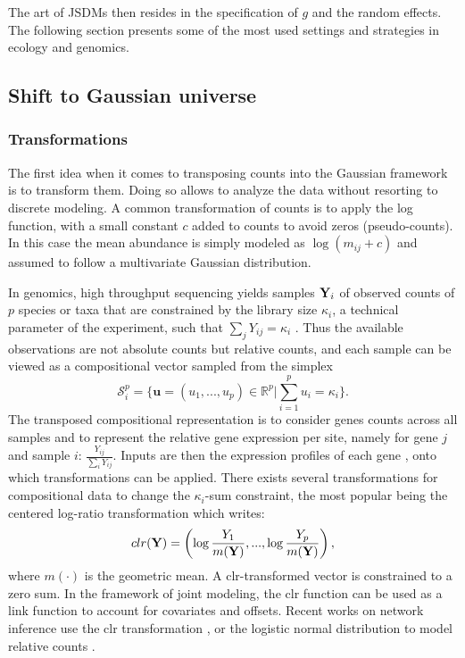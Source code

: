 The art of JSDMs then resides in the specification of $g$ and the random effects. The following section presents some of the most used settings and strategies in ecology and genomics.

\subsection{Shift to Gaussian universe} 
\subsubsection{Transformations}
The first idea when it comes to transposing counts into the Gaussian framework is to transform them. Doing so allows to analyze the data without resorting to discrete modeling. A common transformation of counts is to apply the log function, with a  small constant $c$ added to counts to avoid zeros (pseudo-counts). In this case the mean abundance is simply modeled as $\log(m_{ij}+c)$ and assumed to follow a multivariate Gaussian distribution. 

In genomics, high throughput sequencing yields  samples ${\bf Y}_i$  of observed counts of $p$ species or taxa that are constrained by the library size $\kappa_i$, a technical parameter of the experiment, such that $\sum_j Y_{ij}=\kappa_i$ \citep{GMP17}. Thus the available observations are not absolute counts but relative counts, and each sample can be viewed as a compositional vector \citep{A82} sampled from the simplex
$$\mathcal{S}_i^p = \bigg\{ \boldsymbol{u}=(u_1,...,u_p)\in \mathds{R}^p\bigg\rvert\sum_{i=1}^p u_i = \kappa_i\bigg\}.$$
The transposed compositional representation is to consider  genes counts across all samples and to represent the relative gene expression per site, namely for gene $j$ and sample $i$: $\frac{Y_{ij}}{\sum_i Y_{ij}}$. Inputs are then the expression profiles of each gene \citep{RMR18}, onto which transformations  can be applied. 
There exists several transformations for compositional data to change the $\kappa_i$-sum constraint, the most popular being the centered log-ratio transformation  which writes:
$$clr({\bf Y})=\left(\log \frac{Y_1}{m({\bf Y})}, ..., \log \frac{Y_p}{m({\bf Y})}\right), $$
where $m(\cdot)$ is the geometric mean. A clr-transformed vector is constrained to a zero sum. In the framework of joint modeling, the clr function can be used as a link function to account for covariates and offsets. Recent works on network inference use the clr transformation  \citep{kurtz}, or the logistic normal distribution \citep{AS80} to model relative counts \citep{gcoda}.


